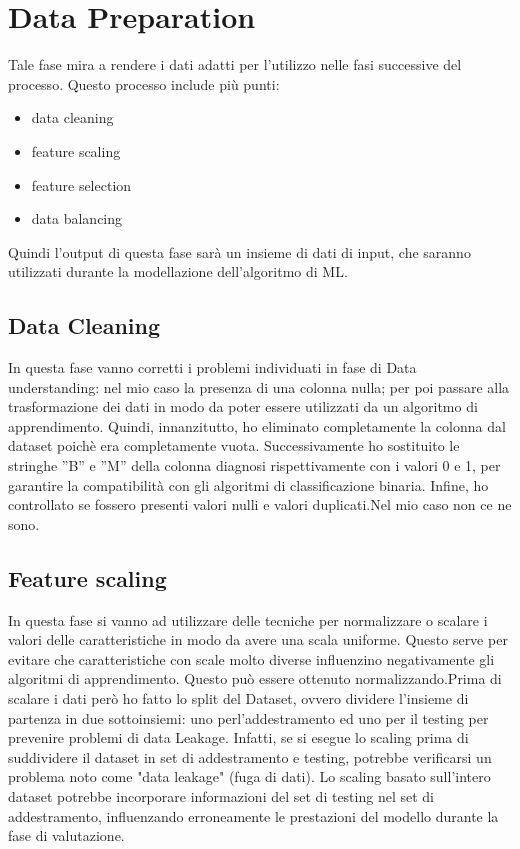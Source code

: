 \documentclass{article}
\begin{document}
\newpage
\section{Data Preparation}
Tale fase mira a rendere i dati adatti per l’utilizzo nelle fasi successive del processo.
Questo processo include più punti:
\begin{itemize}
    \item data cleaning
    \item feature scaling
    \item feature selection
    \item data balancing
\end{itemize}
Quindi l’output di questa fase sarà un insieme di dati di input, che saranno utilizzati durante la
modellazione dell’algoritmo di ML.

\subsection{Data Cleaning}
In questa fase vanno corretti i problemi individuati in fase di Data understanding: nel mio caso la presenza di una colonna nulla; per poi passare alla trasformazione dei dati in modo da poter essere utilizzati da un algoritmo di apprendimento.
Quindi, innanzitutto, ho eliminato completamente la colonna dal dataset poichè era completamente vuota. Successivamente ho sostituito le stringhe ”B” e ”M” della colonna diagnosi rispettivamente con i valori 0 e 1, per garantire la compatibilità con gli algoritmi di classificazione binaria. Infine, ho controllato se fossero presenti valori nulli e valori duplicati.Nel mio caso non ce ne sono.

\subsection{Feature scaling}
In questa fase si vanno ad utilizzare delle tecniche per normalizzare o scalare i valori delle caratteristiche in modo da avere una scala uniforme. Questo serve per evitare che caratteristiche con scale molto diverse influenzino negativamente gli algoritmi di apprendimento. Questo può essere ottenuto normalizzando.Prima di scalare i dati però ho fatto lo split del Dataset, ovvero dividere l’insieme di partenza in due sottoinsiemi: uno perl’addestramento ed uno per il testing per prevenire problemi di data Leakage.
Infatti, se si esegue lo scaling prima di suddividere il dataset in set di addestramento e testing, potrebbe verificarsi un problema noto come "data leakage" (fuga di dati). Lo scaling basato sull'intero dataset potrebbe incorporare informazioni del set di testing nel set di addestramento, influenzando erroneamente le prestazioni del modello durante la fase di valutazione.
\end{document}
